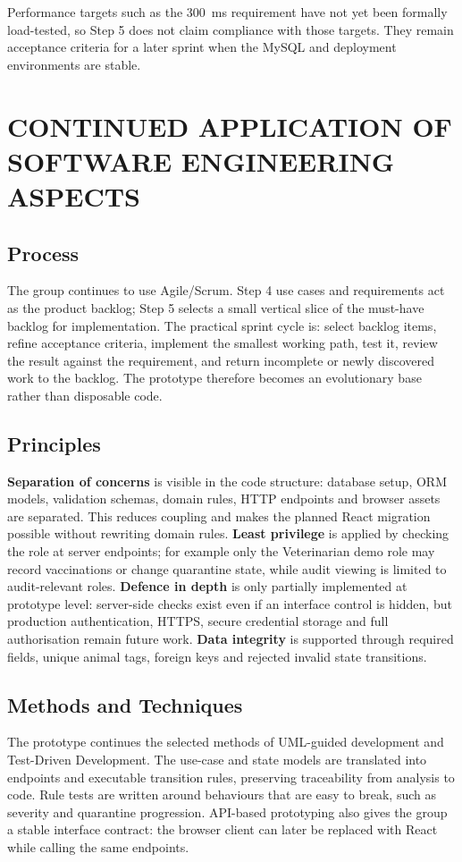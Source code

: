 \documentclass[10pt,twocolumn]{article}
\begin{document}
Performance targets such as the 300~ms requirement have not yet been formally load-tested, so Step 5 does not claim compliance with those targets. They remain acceptance criteria for a later sprint when the MySQL and deployment environments are stable.

\section{CONTINUED APPLICATION OF SOFTWARE ENGINEERING ASPECTS}
\subsection{Process}
The group continues to use Agile/Scrum. Step 4 use cases and requirements act as the product backlog; Step 5 selects a small vertical slice of the must-have backlog for implementation. The practical sprint cycle is: select backlog items, refine acceptance criteria, implement the smallest working path, test it, review the result against the requirement, and return incomplete or newly discovered work to the backlog. The prototype therefore becomes an evolutionary base rather than disposable code.

\subsection{Principles}
\textbf{Separation of concerns} is visible in the code structure: database setup, ORM models, validation schemas, domain rules, HTTP endpoints and browser assets are separated. This reduces coupling and makes the planned React migration possible without rewriting domain rules. \textbf{Least privilege} is applied by checking the role at server endpoints; for example only the Veterinarian demo role may record vaccinations or change quarantine state, while audit viewing is limited to audit-relevant roles. \textbf{Defence in depth} is only partially implemented at prototype level: server-side checks exist even if an interface control is hidden, but production authentication, HTTPS, secure credential storage and full authorisation remain future work. \textbf{Data integrity} is supported through required fields, unique animal tags, foreign keys and rejected invalid state transitions.

\subsection{Methods and Techniques}
The prototype continues the selected methods of UML-guided development and Test-Driven Development. The use-case and state models are translated into endpoints and executable transition rules, preserving traceability from analysis to code. Rule tests are written around behaviours that are easy to break, such as severity and quarantine progression. API-based prototyping also gives the group a stable interface contract: the browser client can later be replaced with React while calling the same endpoints.
\end{document}
